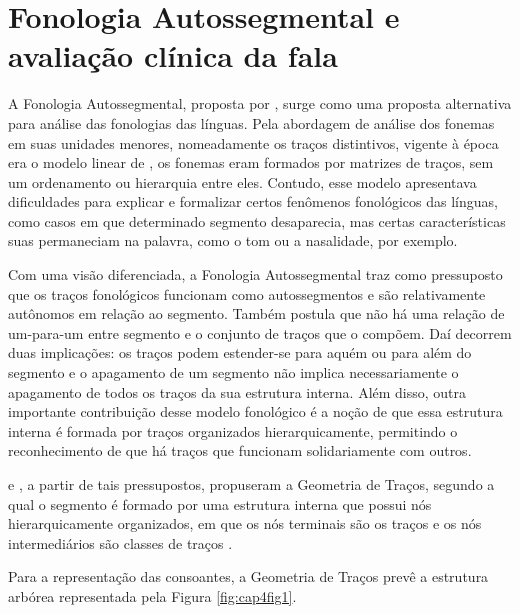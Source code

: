 \documentclass[output=paper,colorlinks,citecolor=brown,booklanguage=portuguese]{langscibook}
\begin{document}
\section{Fonologia Autossegmental e avaliação clínica da fala}



A Fonologia Autossegmental, proposta por \citet{Goldsmith1976}, surge como uma proposta alternativa para análise das fonologias das línguas. Pela abordagem de análise dos fonemas em suas unidades menores, nomeadamente os traços distintivos, vigente à época era o modelo linear de \citet{Chomsky1968}, os fonemas eram formados por matrizes de traços, sem um ordenamento ou hierarquia entre eles. Contudo, esse modelo apresentava dificuldades para explicar e formalizar certos fenômenos fonológicos das línguas, como casos em que determinado segmento desaparecia, mas certas características suas permaneciam na palavra, como o tom ou a nasalidade, por exemplo. 

Com uma visão diferenciada, a Fonologia Autossegmental traz como pressuposto que os traços fonológicos funcionam como autossegmentos e são relativamente autônomos em relação ao segmento. Também postula que não há uma relação de um-para-um entre segmento e o conjunto de traços que o compõem. Daí decorrem duas implicações: os traços podem estender-se para aquém ou para além do segmento e o apagamento de um segmento não implica necessariamente o apagamento de todos os traços da sua estrutura interna. Além disso, outra importante contribuição desse modelo fonológico é a noção de que essa estrutura interna é formada por traços organizados hierarquicamente, permitindo o reconhecimento de que há traços que funcionam solidariamente com outros.

\citet{Clements1985} e \citet{Clements1995}, a partir de tais pressupostos, propuseram a Geometria de Traços, segundo a qual o segmento é formado por uma estrutura interna que possui nós hierarquicamente organizados, em que os nós terminais são os traços e os nós intermediários são classes de traços \citep{MatzenauerHernandorena2001}. 

Para a representação das consoantes, a Geometria de Traços prevê a estrutura arbórea representada pela Figura \ref{fig:cap4fig1}.
\end{document}
